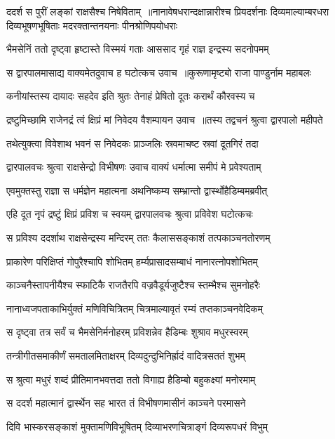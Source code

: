 ददर्श स पुरीं लङ्कां राक्षसैश्च निषेविताम् ॥नानावेषधरान्दक्षान्नारीश्च प्रियदर्शनाः
\twolineshloka
{दिव्यमाल्याम्बरधरा दिव्यभूषणभूषिताः}
{मदरक्तान्तनयनाः पीनश्रोणिपयोधराः}


\twolineshloka
{भैमसेनिं ततो दृष्ट्वा हृष्टास्ते विस्मयं गताः}
{आससाद गृहं राज्ञ इन्द्रस्य सदनोपमम्}


\twolineshloka
{स द्वारपालमासाद्य वाक्यमेतदुवाच ह}
{घटोत्कच उवाच ॥कुरूणामृष्टबो राजा पाण्डुर्नाम महाबलः}


\twolineshloka
{कनीयांस्तस्य दायादः सहदेव इति श्रुतः}
{तेनाहं प्रेषितो दूतः करार्थं कौरवस्य च}


\twolineshloka
{द्रष्टुमिच्छामि राजेनद्रं त्वं क्षिप्रं मां निवेदय}
{वैशम्पायन उवाच ॥तस्य तद्वचनं श्रुत्वा द्वारपालो महीपते}


\twolineshloka
{तथेत्युक्त्वा विवेशाथ भवनं स निवेदकः}
{प्राञ्जलिः स्रवमाचष्ट स्रवां दूतगिरं तदा}


\twolineshloka
{द्वारपालवचः श्रुत्वा राक्षसेन्द्रो विभीषणः}
{उवाच वाक्यं धर्मात्मा समीपं मे प्रवेश्यताम्}


\twolineshloka
{एवमुक्तस्तु राज्ञा स धर्मज्ञेन महात्मना}
{अथनिष्कम्य सम्भ्रान्तो द्वार्स्थोहैडिम्बमब्रवीत्}


\twolineshloka
{एहि दूत नृपं द्रष्टुं क्षिप्रं प्रविश च स्वयम्}
{द्वारपालवचः श्रुत्वा प्रविवेश घटोत्कचः}


\twolineshloka
{स प्रविश्य ददर्शाथ राक्षसेन्द्रस्य मन्दिरम्}
{ततः कैलाससङ्काशं तत्पकाञ्चनतोरणम्}


\twolineshloka
{प्राकारेण परिक्षिप्तं गोपुरैश्चापि शोभितम्}
{हर्म्यप्रासादसम्बाधं नानारत्नोपशोभितम्}


\twolineshloka
{काञ्चनैस्तापनीयैश्च स्फाटिकै राजतैरपि}
{वज्रवैडूर्यजुष्टैश्च स्तम्भैश्च सुमनोहरैः}


\twolineshloka
{नानाध्वजपताकाभिर्युक्तं मणिविचित्रितम्}
{चित्रमाल्यावृतं रम्यं तप्तकाञ्चनवेदिकम्}


\twolineshloka
{स दृष्ट्वा तत्र सर्वं च भैमसेनिर्मनोहरम्}
{प्रविशन्नेव हैडिम्बः शुश्राव मधुरस्वरम्}


\twolineshloka
{तन्त्रीगीतसमाकीर्णं समतालमिताक्षरम्}
{दिव्यदुन्दुभिनिर्ह्रादं वादित्रसततं शुभम्}


\twolineshloka
{स श्रुत्वा मधुरं शब्दं प्रीतिमानभवत्तदा}
{ततो विगाह्य हैडिम्बो बहुकक्ष्यां मनोरमाम्}


\twolineshloka
{स ददर्श महात्मानं द्वार्स्थेन सह भारत}
{तं विभीषणमासीनं काञ्चने परमासने}


\twolineshloka
{दिवि भास्करसङ्काशं मुक्तामणिविभूषितम्}
{दिव्याभरणचित्राङ्गं दिव्यरूपधरं विभुम्}


